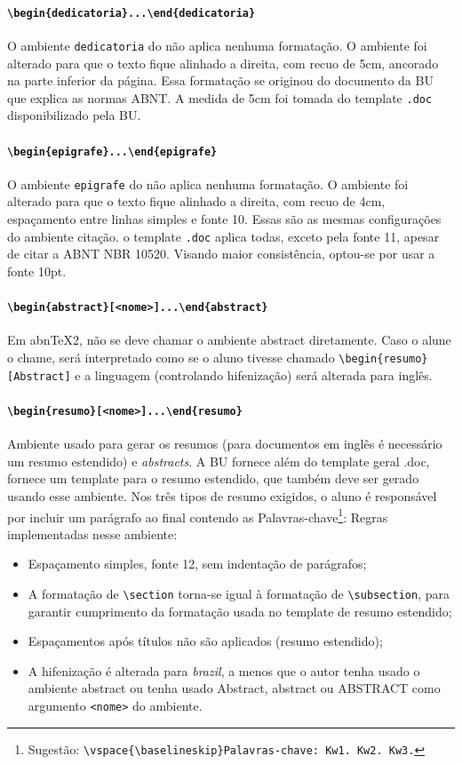 \documentclass[embeddedlogo]{ufsc-thesis-rn46-2019}
\newcommand{\lacmd}[1]{\texttt{\textbackslash{}#1}}
\newcommand{\laenv}[1]{\texttt{\textbackslash{}begin\{#1\}...\textbackslash{}end\{#1\}}}
\newcommand{\laenvi}[2]{\texttt{\textbackslash{}begin\{#1\}[#2]...\textbackslash{}end\{#1\}}}
\begin{document}
\paragraph*{\laenv{dedicatoria}}
O ambiente \texttt{dedicatoria} do \abnTeX não aplica nenhuma formatação. O
ambiente foi alterado para que o texto fique alinhado a direita, com recuo de
5cm, ancorado na parte inferior da página. Essa formatação se originou do
documento da BU que explica as normas ABNT. A medida de 5cm foi tomada do
template \texttt{.doc} disponibilizado pela BU.

\paragraph*{\laenv{epigrafe}}
O ambiente \texttt{epigrafe} do \abnTeX não aplica nenhuma formatação. O
ambiente foi alterado para que o texto fique alinhado a direita, com recuo de
4cm, espaçamento entre linhas simples e fonte 10. Essas são as mesmas
configurações do ambiente citação. o template \texttt{.doc} aplica todas, exceto
pela fonte 11, apesar de citar a ABNT NBR 10520. Visando maior consistência,
optou-se por usar a fonte 10pt.

\paragraph*{\laenvi{abstract}{<nome>}}
Em abnTeX2, não se deve chamar o ambiente abstract diretamente. Caso o alune o
chame, será interpretado como se o aluno tivesse chamado
\lacmd{begin\{resumo\}[Abstract]} e a linguagem (controlando hifenização) será
alterada para inglês.

\paragraph*{\laenvi{resumo}{<nome>}}
Ambiente usado para gerar os resumos (para documentos em inglês é necessário um
resumo estendido) e \emph{abstracts}. A BU fornece além do template geral .doc,
fornece um template para o resumo estendido, que também deve ser gerado usando
esse ambiente. Nos três tipos de resumo exigidos, o aluno é responsável por
incluir um parágrafo ao final contendo as Palavras-chave\footnote{Sugestão:
  \lacmd{vspace\{\lacmd{baselineskip}\}Palavras-chave: Kw1. Kw2. Kw3.}}: Regras
implementadas nesse ambiente:
\begin{itemize}
\item Espaçamento simples, fonte 12, sem indentação de parágrafos;
\item A formatação de \lacmd{section} torna-se igual à formatação de
  \lacmd{subsection}, para garantir cumprimento da formatação usada no template de
  resumo estendido;
\item Espaçamentos após títulos não são aplicados (resumo estendido);
\item A hifenização é alterada para \textit{brazil}, a menos que o autor tenha
  usado o ambiente abstract ou tenha usado Abstract, abstract ou ABSTRACT como
  argumento \texttt{<nome>} do ambiente.
\end{itemize}
\end{document}
